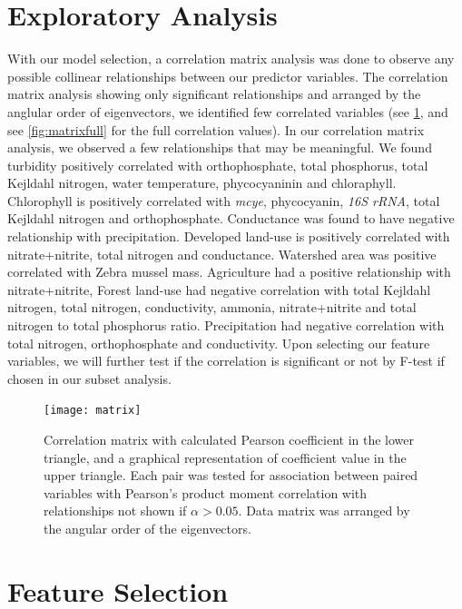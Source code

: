 \clearpage

\section{Exploratory Analysis}

With our model selection, a correlation matrix analysis was done to observe any possible collinear relationships between our predictor variables. The correlation matrix analysis showing only significant relationships and arranged by the anglular order of eigenvectors, we identified few correlated variables  (see \ref{matrix}, and see \ref{fig:matrixfull} for the full correlation values). In our correlation matrix analysis, we observed a few relationships that may be meaningful. We found turbidity positively correlated with orthophosphate, total phosphorus, total Kejldahl nitrogen, water temperature, phycocyaninin and chloraphyll. Chlorophyll is positively correlated with \emph{mcye}, phycocyanin, \emph{16S rRNA}, total Kejldahl nitrogen and orthophosphate. Conductance was found to have negative relationship with precipitation.
Developed land-use is positively correlated with nitrate+nitrite, total nitrogen and conductance.
Watershed area was positive correlated with Zebra mussel mass.
Agriculture had a positive relationship with nitrate+nitrite,
Forest land-use had negative correlation with total Kejldahl nitrogen, total nitrogen, conductivity, ammonia, nitrate+nitrite and total nitrogen to total phosphorus ratio.
Precipitation had negative correlation with total nitrogen, orthophosphate and conductivity. Upon selecting our feature variables, we will further test if the correlation is significant or not by F-test if chosen in our subset analysis.




\begin{figure}

  \texttt{[image: matrix]}
  \vspace*{-10mm}
  \caption{
  Correlation matrix with calculated Pearson coefficient in the lower triangle, and a graphical representation of coefficient value in the upper triangle. Each pair was tested for association between paired variables with Pearson's product moment correlation with relationships not shown if $\alpha>0.05$. Data matrix was arranged by the angular order of the eigenvectors.}
  \label{matrix}
\end{figure}

\clearpage

\section{Feature Selection}

